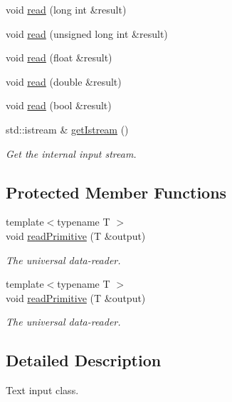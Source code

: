 \begin{DoxyCompactItemize}
\item 
void \mbox{\hyperlink{classENSEM_1_1TextReader_a6175ad804f9b13604f1cc7466a95725a}{read}} (long int \&result)
\item 
void \mbox{\hyperlink{classENSEM_1_1TextReader_a88188c5da2fe2882d38e7f8fa70b6e29}{read}} (unsigned long int \&result)
\item 
void \mbox{\hyperlink{classENSEM_1_1TextReader_a67d7171b0abb40a3c33c7cc92452d78f}{read}} (float \&result)
\item 
void \mbox{\hyperlink{classENSEM_1_1TextReader_ac12d688ee2475e365919e16183b0c816}{read}} (double \&result)
\item 
void \mbox{\hyperlink{classENSEM_1_1TextReader_a0aa4b524a014a6c53980d4717b48b733}{read}} (bool \&result)
\item 
std\+::istream \& \mbox{\hyperlink{classENSEM_1_1TextReader_a855b7272df1bd50c18f730f3ac882428}{get\+Istream}} ()
\begin{DoxyCompactList}\small\item\em Get the internal input stream. \end{DoxyCompactList}\end{DoxyCompactItemize}
\subsection*{Protected Member Functions}
\begin{DoxyCompactItemize}
\item 
{\footnotesize template$<$typename T $>$ }\\void \mbox{\hyperlink{classENSEM_1_1TextReader_afa5fccab911c19d1365a51f39df01d96}{read\+Primitive}} (T \&output)
\begin{DoxyCompactList}\small\item\em The universal data-\/reader. \end{DoxyCompactList}\item 
{\footnotesize template$<$typename T $>$ }\\void \mbox{\hyperlink{classENSEM_1_1TextReader_afa5fccab911c19d1365a51f39df01d96}{read\+Primitive}} (T \&output)
\begin{DoxyCompactList}\small\item\em The universal data-\/reader. \end{DoxyCompactList}\end{DoxyCompactItemize}


\subsection{Detailed Description}
Text input class. 

